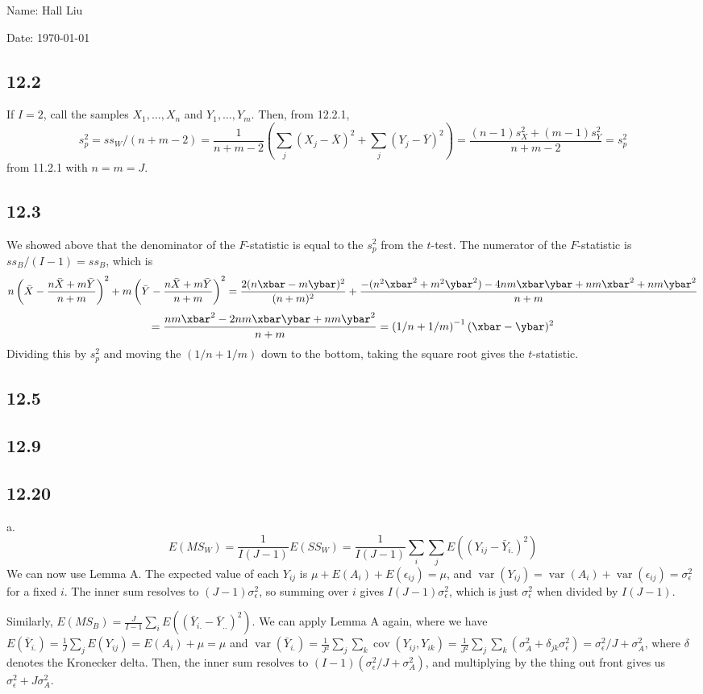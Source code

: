 \documentclass{article}
\newcommand{\ep}{\epsilon}
\DeclareMathOperator{\cov}{cov}
\DeclareMathOperator{\var}{var}
\begin{document}
Name: Hall Liu

Date: \today 
\vspace{1.5cm}
\subsection*{12.2}
If $I=2$, call the samples $X_1,\ldots,X_n$ and $Y_1,\ldots,Y_m$. Then, from 12.2.1,
$$s_p^2=ss_W/(n+m-2)=\frac{1}{n+m-2}\left(\sum_j(X_j-\bar{X})^2+\sum_j(Y_j-\bar{Y})^2\right)=\frac{(n-1)s_X^2+(m-1)s_Y^2}{n+m-2}=s_p^2$$
from 11.2.1 with $n=m=J$.
\subsection*{12.3}
We showed above that the denominator of the $F$-statistic is equal to the $s_p^2$ from the $t$-test. The numerator of the $F$-statistic is $ss_B/(I-1)=ss_B$, which is 
$$n\left(\bar{X}-\frac{n\bar{X}+m\bar{Y}}{n+m}\right)^2+m\left(\bar{Y}-\frac{n\bar{X}+m\bar{Y}}{n+m}\right)^2=\frac{2(n\xbar-m\ybar)^2}{(n+m)^2}+\frac{-(n^2\xbar^2+m^2\ybar^2)-4nm\xbar\ybar+nm\xbar^2+nm\ybar^2}{n+m}$$
$$=\frac{nm\xbar^2-2nm\xbar\ybar+nm\ybar^2}{n+m}=\left(1/n+1/m\right)^{-1}(\xbar-\ybar)^2$$
Dividing this by $s_p^2$ and moving the $\left(1/n+1/m\right)$ down to the bottom, taking the square root gives the $t$-statistic.
\subsection*{12.5}
\subsection*{12.9}
\subsection*{12.20}
a. $$E(MS_W)=\frac{1}{I(J-1)}E(SS_W)=\frac{1}{I(J-1)}\sum_i\sum_jE((Y_{ij}-\bar{Y}_{i.})^2)$$
We can now use Lemma A. The expected value of each $Y_{ij}$ is $\mu+E(A_i)+E(\ep_{ij})=\mu$, and $\var(Y_{ij})=\var(A_i)+\var(\ep_{ij})=\sigma_\ep^2$ for a fixed $i$. The inner sum resolves to $(J-1)\sigma_\ep^2$, so summing over $i$ gives $I(J-1)\sigma_\ep^2$, which is just $\sigma_\ep^2$ when divided by $I(J-1)$.

Similarly, $E(MS_B)=\frac{J}{I-1}\sum_iE((\bar{Y}_{i.}-\bar{Y}_{..})^2)$. We can apply Lemma A again, where we have $E(\bar{Y}_{i.})=\frac{1}{J}\sum_jE(Y_{ij})=E(A_i)+\mu=\mu$ and $\var(\bar{Y}_{i.})=\frac{1}{J^2}\sum_j\sum_k\cov(Y_{ij},Y_{ik})=\frac{1}{J^2}\sum_j\sum_k(\sigma_A^2+\delta_{jk}\sigma_\ep^2)=\sigma_\ep^2/J+\sigma_A^2$, where $\delta$ denotes the Kronecker delta. Then, the inner sum resolves to $(I-1)(\sigma_\ep^2/J+\sigma_A^2)$, and multiplying by the thing out front gives us $\sigma_\ep^2+J\sigma_A^2$.
\end{document}

